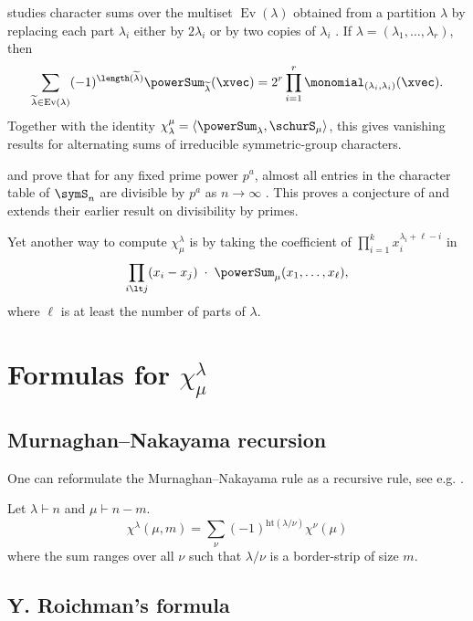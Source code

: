  studies character sums over the multiset
$\operatorname{Ev}(\lambda)$ obtained from a partition $\lambda$ by replacing
each part $\lambda_i$ either by $2\lambda_i$ or by two copies of $\lambda_i$
\cite{Westrem2024x}.  If $\lambda=(\lambda_1,\dotsc,\lambda_r)$, then
\[
  \sum_{\widetilde{\lambda}\in \operatorname{Ev}(\lambda)}
  (-1)^{\length(\widetilde{\lambda})}
  \powerSum_{\widetilde{\lambda}}(\xvec)
  =
  2^r \prod_{i=1}^r \monomial_{(\lambda_i,\lambda_i)}(\xvec).
\]
Together with the identity
$\chi^\mu_\lambda=\langle \powerSum_\lambda,\schurS_\mu\rangle$,
this gives vanishing results for alternating sums of irreducible
symmetric-group characters.

 and  prove that for any fixed
prime power $p^a$, almost all entries in the character table of $\symS_n$ are
divisible by $p^a$ as $n \to \infty$ \cite{PeluseSoundararajan2025}.  This
proves a conjecture of  and extends their earlier
result on divisibility by primes.


Yet another way to compute $\chi^{\lambda}_{\mu}$ is by taking the coefficient
of $\prod_{i=1}^k x_i^{\lambda_i + \ell -i}$ in
\[
 \prod_{i \lt j} (x_i - x_j ) \; \cdot \; \powerSum_{\mu}(x_1,\dotsc,x_\ell),
\]
where $\ell$ is at least the number of parts of $\lambda$.



\section[chiFormulas]{Formulas for $\chi^{\lambda}_{\mu}$}


\subsection[mnRecursion]{Murnaghan--Nakayama recursion}

One can reformulate the Murnaghan--Nakayama rule as a recursive rule,
see e.g. \cite[Sec.~2.4.4]{JamesKerber1984}.

Let $\lambda \vdash n$ and $\mu \vdash n-m$.
\[
\chi^{\lambda}(\mu,m) = \sum_{\nu} (-1)^{\mathrm{ht}(\lambda /\nu)} \chi^{\nu}(\mu)
\]
where the sum ranges over all $\nu$ such that $\lambda/\nu$ is a border-strip of size $m$.


\subsection[roichmanChi]{Y. Roichman's formula}

